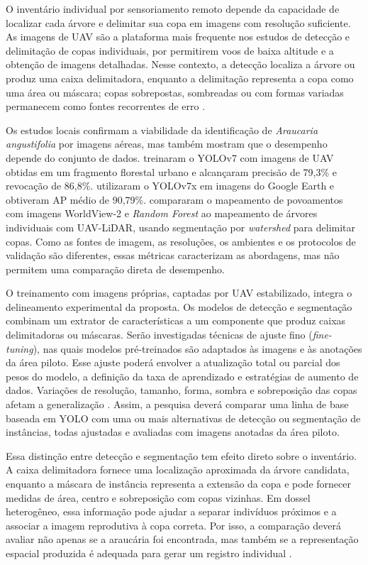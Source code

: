 O inventário individual por sensoriamento remoto depende da capacidade de localizar cada árvore e delimitar sua copa em imagens com resolução suficiente. As imagens de UAV são a plataforma mais frequente nos estudos de detecção e delimitação de copas individuais, por permitirem voos de baixa altitude e a obtenção de imagens detalhadas. Nesse contexto, a detecção localiza a árvore ou produz uma caixa delimitadora, enquanto a delimitação representa a copa como uma área ou máscara; copas sobrepostas, sombreadas ou com formas variadas permanecem como fontes recorrentes de erro \citep{zhao2023}.

Os estudos locais confirmam a viabilidade da identificação de \textit{Araucaria angustifolia} por imagens aéreas, mas também mostram que o desempenho depende do conjunto de dados. \citet{correa2024} treinaram o YOLOv7 com imagens de UAV obtidas em um fragmento florestal urbano e alcançaram precisão de 79,3\% e revocação de 86,8\%. \citet{karasinski2025} utilizaram o YOLOv7x em imagens do Google Earth e obtiveram AP médio de 90,79\%. \citet{saad2021} compararam o mapeamento de povoamentos com imagens WorldView-2 e \textit{Random Forest} ao mapeamento de árvores individuais com UAV-LiDAR, usando segmentação por \textit{watershed} para delimitar copas. Como as fontes de imagem, as resoluções, os ambientes e os protocolos de validação são diferentes, essas métricas caracterizam as abordagens, mas não permitem uma comparação direta de desempenho.

O treinamento com imagens próprias, captadas por UAV estabilizado, integra o delineamento experimental da proposta. Os modelos de detecção e segmentação combinam um extrator de características a um componente que produz caixas delimitadoras ou máscaras. Serão investigadas técnicas de ajuste fino (\textit{fine-tuning}), nas quais modelos pré-treinados são adaptados às imagens e às anotações da área piloto. Esse ajuste poderá envolver a atualização total ou parcial dos pesos do modelo, a definição da taxa de aprendizado e estratégias de aumento de dados. Variações de resolução, tamanho, forma, sombra e sobreposição das copas afetam a generalização \citep{zhao2023}. Assim, a pesquisa deverá comparar uma linha de base baseada em YOLO com uma ou mais alternativas de detecção ou segmentação de instâncias, todas ajustadas e avaliadas com imagens anotadas da área piloto.

Essa distinção entre detecção e segmentação tem efeito direto sobre o inventário. A caixa delimitadora fornece uma localização aproximada da árvore candidata, enquanto a máscara de instância representa a extensão da copa e pode fornecer medidas de área, centro e sobreposição com copas vizinhas. Em dossel heterogêneo, essa informação pode ajudar a separar indivíduos próximos e a associar a imagem reprodutiva à copa correta. Por isso, a comparação deverá avaliar não apenas se a araucária foi encontrada, mas também se a representação espacial produzida é adequada para gerar um registro individual \citep{zhao2023}.

